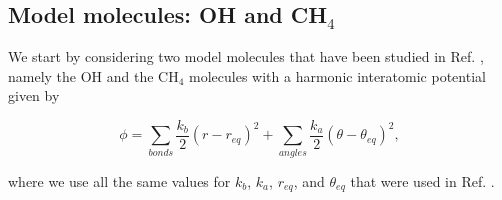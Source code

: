 \documentclass[aps,prb,superscriptaddress,amsmath,amssymb,showpacs,twocolumn]{revtex4}
\begin{document}



\subsection{Model molecules: OH and CH$_4$}

We start by considering two model molecules that have been studied in Ref. \cite{witt+09jcp},
namely the OH and the CH$_4$ molecules with a harmonic interatomic potential given by

\begin{equation}
\phi=\sum_{bonds} \frac{k_b}{2} (r-r_{eq})^2 + \sum_{angles} \frac{k_a}{2}(\theta - \theta_{eq})^2,
\label{eq:model}
\end{equation}

\noindent where we use all the same values for $k_b$, $k_a$, $r_{eq}$, and $\theta_{eq}$ that were used in Ref. \cite{witt+09jcp}.
\end{document}
